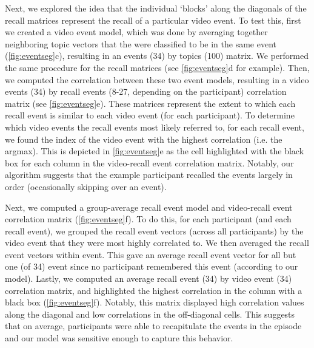\documentclass{article}
\begin{document}
{Next, we explored the idea that the individual `blocks' along the diagonals of the recall matrices represent the recall of a particular video event. To test this, first we created a video event model, which was done by averaging together neighboring topic vectors that the were classified to be in the same event (\ref{fig:eventseg}c), resulting in an events (34) by topics (100) matrix.  We performed the same procedure for the recall matrices (see \ref{fig:eventseg}d for example). Then, we computed the correlation between these two event models, resulting in a video events (34) by recall events (8-27, depending on the participant) correlation matrix (see \ref{fig:eventseg}e). These matrices represent the extent to which each recall event is similar to each video event (for each participant). To determine which video events the recall events most likely referred to, for each recall event, we found the index of the video event with the highest correlation (i.e. the argmax).  This is depicted in \ref{fig:eventseg}e as the cell highlighted with the black box for each column in the video-recall event correlation matrix. Notably, our algorithm suggests that the example participant recalled the events largely in order (occasionally skipping over an event).

Next, we computed a group-average recall event model and video-recall event correlation matrix (\ref{fig:eventseg}f).  To do this, for each participant (and each recall event), we grouped the recall event vectors (across all participants) by the video event that they were most highly correlated to. We then averaged the recall event vectors within event. This gave an average recall event vector for all but one (of 34) event since no participant remembered this event (according to our model). Lastly, we computed an average recall event (34) by video event (34) correlation matrix, and highlighted the highest correlation in the column with a black box (\ref{fig:eventseg}f). Notably, this matrix displayed high correlation values along the diagonal and low correlations in the off-diagonal cells. This suggests that on average, participants were able to recapitulate the events in the episode and our model was sensitive enough to capture this behavior.

}
\end{document}

